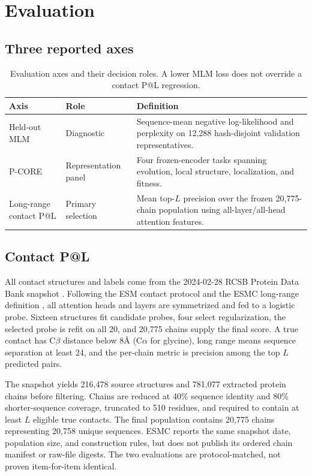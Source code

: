\documentclass{article}
\begin{document}
\section{Evaluation}
\label{sec:evaluation}

\subsection{Three reported axes}

\begin{table}[H]
  \centering
  \small
  \begin{tabularx}{\textwidth}{@{}p{}p{}Y@{}}
    \toprule
    Axis & Role & Definition \\
    \midrule
    Held-out MLM & Diagnostic & Sequence-mean negative log-likelihood and perplexity on 12,288 hash-disjoint validation representatives. \\
    P-CORE & Representation panel & Four frozen-encoder tasks spanning evolution, local structure, localization, and fitness. \\
    Long-range contact P@L & Primary selection & Mean top-$L$ precision over the frozen 20,775-chain population using all-layer/all-head attention features. \\
    \bottomrule
  \end{tabularx}
  \caption{Evaluation axes and their decision roles. A lower MLM loss does not
  override a contact P@L regression.}
  \label{tab:evaluation-axes}
\end{table}

\subsection{Contact P@L}

All contact structures and labels come from the 2024-02-28 RCSB Protein Data
Bank snapshot \citep{berman2000pdb}. Following the ESM contact protocol and
the ESMC long-range definition \citep{rao2021unsupervised,
candido2026language}, all attention heads and layers are symmetrized and fed
to a logistic probe. Sixteen structures fit candidate probes, four select
regularization, the selected probe is refit on all 20, and 20,775 chains
supply the final score. A true contact has
C$\beta$ distance below 8\AA{} (C$\alpha$ for glycine), long range means
sequence separation at least 24, and the per-chain metric is precision among
the top $L$ predicted pairs.

The snapshot yields 216,478 source structures and 781,077 extracted protein
chains before filtering. Chains are reduced at 40\% sequence identity and 80\%
shorter-sequence coverage, truncated to 510 residues, and required to contain
at least $L$ eligible true contacts. The final population contains 20,775
chains representing 20,758 unique sequences. ESMC reports the same snapshot
date, population size, and construction rules, but does not publish its
ordered chain manifest or raw-file digests. The two evaluations are
protocol-matched, not proven item-for-item identical.
\end{document}
